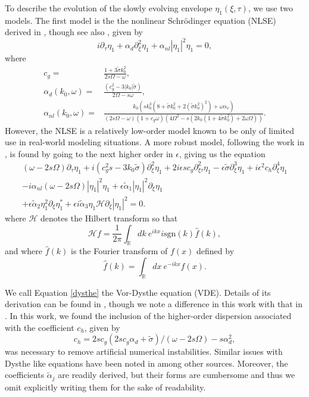 \documentclass[a4paper,11pt]{article}
\newcommand{\pd}{\partial}
\begin{document}
To describe the evolution of the slowly evolving envelope $\eta_{1}(\xi,\tau)$, we use two models.  The first model is the the nonlinear Schr\"{o}dinger equation (NLSE) derived in \cite{curtis8}, though see also \cite{thomas2012nonlinear}, given by 
\[
i\pd_{\tau}\eta_{1} + \alpha_{d}\pd_{\xi}^{2}\eta_{1} + \alpha_{nl}\left|\eta_{1} \right|^{2}\eta_{1} = 0, 
\]
where 
\begin{align*}
c_{g} = & \frac{1+3\tilde{\sigma}k_{0}^{2}}{2s\Omega - \omega},\\
\alpha_{d}(k_{0},\omega) = & \frac{(c^2_{g} - 3|k_{0}|\tilde{\sigma})}{2\Omega-s\omega},\\
\alpha_{nl}(k_{0},\omega) = & \frac{k_{0}\left( sk_{0}^{3}\left(8 + \tilde{\sigma}k_{0}^{2} + 2(\tilde{\sigma}k_{0}^{2})^{2}\right) + \omega \alpha_{v}\right)}{\left(2s\Omega -\omega\right)(1+c_{g}\omega)\left(4\Omega^2-s(2k_{0}(1+4\tilde{\sigma}k_{0}^{2})+2\omega\Omega)\right)}.
\end{align*}
However, the NLSE is a relatively low-order model known to be only of limited use in real-world modeling situations.  A more robust model, following the work in \cite{dysthe1}, is found by going to the next higher order in $\epsilon$, giving us the equation
\begin{multline}
(\omega-2s\Omega)\pd_{\tau}\eta_{1} + i(c_{g}^{2}s-3k_{0}\tilde{\sigma})\pd_{\xi}^{2}\eta_{1} + 2i\epsilon s c_{g}\pd^{2}_{\xi\tau}\eta_{1} - \epsilon\tilde{\sigma} \pd^{3}_{\xi}\eta_{1} + i\epsilon^{2}c_{h}\pd_{\xi}^{4}\eta_{1} \\
- i \alpha_{nl}(\omega-2s\Omega)\left|\eta_{1}\right|^{2}\eta_{1}
+ \epsilon \tilde{\alpha}_{1}\left|\eta_{1}\right|^{2}\pd_{\xi}\eta_{1}\\
+ \epsilon\tilde{\alpha}_{2}\eta_{1}^{2}\pd_{\xi}\eta^{\ast}_{1} +
\epsilon i\tilde{\alpha}_{3}\eta_{1}\mathcal{H}\pd_{\xi}\left|\eta_{1}\right|^{2}= 0.
\label{dysthe}
\end{multline}
where $\mathcal{H}$ denotes the Hilbert transform so that 
\[
\mathcal{H}f = \frac{1}{2\pi}\int_{\mathbb{R}}dk~ e^{ikx}  i\mbox{sgn}(k) \hat{f}(k),
\]
and where $\hat{f}(k)$ is the Fourier transform of $f(x)$ defined by
\[
\hat{f}(k) = \int_{\mathbb{R}}dx~ e^{-ikx}f(x).
\]

We call Equation \eqref{dysthe} the Vor-Dysthe equation (VDE).  Details of its derivation can be found in \cite{curtis8}, though we note a difference in this work with that in \cite{curtis8}.  In this work, we found the inclusion of the higher-order dispersion associated with the coefficient $c_{h}$, given by
\[
c_{h} = 2sc_{g}(2sc_{g}\alpha_{d}+\tilde{\sigma})/(\omega-2s\Omega) - s\alpha_{d}^{2},
\]
was necessary to remove artificial numerical instabilities.  Similar issues with Dysthe like equations have been noted in \cite{eeltink} among other sources.  Moreover, the coefficients $\tilde{\alpha}_{j}$ are readily derived, but their forms are cumbersome and thus we omit explicitly writing them for the sake of readability.  
\end{document}
